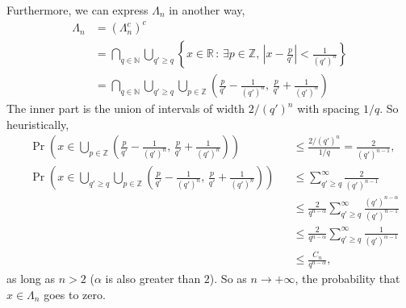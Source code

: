 \documentclass[12pt]{article}
\theoremstyle{plain}
\theoremstyle{definition}
\begin{document}
    Furthermore, we can express $\Lambda_n$ in another way,
    $$\begin{aligned}
        \Lambda_n
        &=(\Lambda_n^c)^c\\
        &=\bigcap_{q\in\mathbb{N}}\bigcup_{q'\geq q}
        \left\{x\in\mathbb{R}\,:\,\exists
        p\in\mathbb{Z},\,\left|x-\frac{p}{q'}\right|<\frac{1}{(q')^n}\right\}\\
        &=\bigcap_{q\in\mathbb{N}}\bigcup_{q'\geq q}\bigcup_{p\in\mathbb{Z}}
        \left(\frac{p}{q'}-\frac{1}{(q')^n},\,\frac{p}{q'}+\frac{1}{(q')^n}\right)
    \end{aligned}$$
    The inner part is the union of intervals of width $2/(q')^n$ with spacing $1/q$.
    So heuristically, 
    $$\begin{aligned}
    &\Pr\left(x\in
    \bigcup_{p\in\mathbb{Z}}\left(\frac{p}{q'}-\frac{1}{(q')^n},\,\frac{p}{q'}+\frac{1}{(q')^n}\right)\right)
    &&\leq\frac{2/(q')^n}{1/q}=\frac{2}{(q')^{n-1}},\\
    &\Pr\left(x\in
    \bigcup_{q'\geq q}
    \bigcup_{p\in\mathbb{Z}}\left(\frac{p}{q'}-\frac{1}{(q')^n},\,\frac{p}{q'}+\frac{1}{(q')^n}\right)\right)
    &&\leq\sum_{q'\geq
    q}^\infty\frac{2}{(q')^{n-1}}\\
    &\quad &&\leq\frac{2}{q^{n-\alpha}}\sum_{q'\geq
    q}^\infty\frac{(q')^{n-\alpha}}{(q')^{n-1}}\\
    &\quad &&\leq\frac{2}{q^{n-\alpha}}\sum_{q'\geq
    q}^\infty\frac{1}{(q')^{\alpha-1}}\\
    &\quad &&\leq\frac{C_n}{q^{n-\alpha}},
    \end{aligned}$$
    as long as $n> 2$ ($\alpha$ is also greater than $2$).
    So as $n\rightarrow+\infty$, the probability that $x\in\Lambda_n$ goes to zero.
\end{document}
